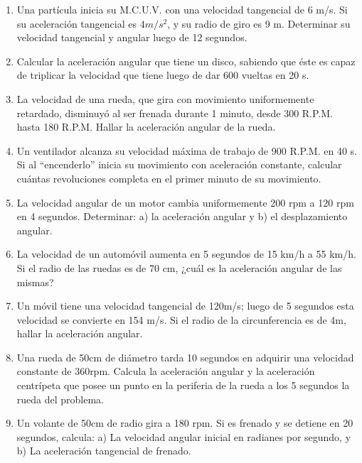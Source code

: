 \documentclass[a5paper,pagesize,10pt,bibtotoc,pointlessnumbers,
normalheadings,DIV=9,fleqn,x11names,table,twoside=false]{scrbook}
\begin{document}
\begin{enumerate}

\item Una partícula inicia su M.C.U.V. con una velocidad tangencial de 6 m/s. Si su aceleración tangencial es $4 m/s^2$, y su 
radio de giro es 9 m. Determinar su velocidad tangencial y angular luego de 12 segundos.

\item Calcular la aceleración angular que tiene un disco, sabiendo que éste es capaz de triplicar la velocidad que tiene luego de 
dar 600 vueltas en 20 s.

\item La velocidad de una rueda, que gira con movimiento uniformemente retardado, disminuyó al ser frenada durante 1 minuto, desde 
300 R.P.M. hasta 180 R.P.M. Hallar la aceleración angular de la rueda.

\item Un ventilador alcanza su velocidad máxima de trabajo de 900 R.P.M. en 40 s. Si al ``encenderlo'' inicia su movimiento con 
aceleración constante, calcular cuántas revoluciones completa en el primer minuto de su movimiento.

\item La velocidad angular de un motor cambia uniformemente
 200 rpm a 120 rpm en 4 segundos. Determinar: a) la aceleración 
angular y b) el
 desplazamiento angular.

\item  La velocidad de
 un automóvil aumenta en 5 segundos de 15 km/h a 55 km/h. Si el radio de las ruedas es de 70
 cm, ¿cuál es 
la aceleración angular de las mismas? 

\item Un móvil tiene una velocidad tangencial de 120m/s; luego de 5 segundos esta velocidad se convierte en 154 m/s. Si el radio 
de la circunferencia es de 4m, hallar la aceleración angular. 

\item Una rueda de 50cm de diámetro tarda 10 segundos en adquirir una velocidad constante de 360rpm. Calcula la aceleración 
angular y la aceleración centrípeta que posee un punto en la periferia de la rueda a los 5 segundos la rueda del problema.

\item Un volante de 50cm de radio gira a 180 rpm. Si es frenado y se detiene en 20 segundos, calcula: a) La velocidad angular 
inicial en radianes por segundo, y b) La aceleración tangencial de frenado.


\end{enumerate}
\end{document}
